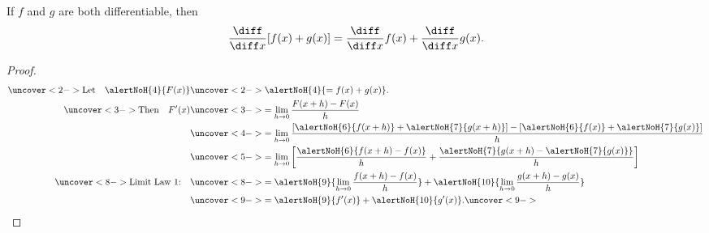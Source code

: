 \begin{frame}
\begin{theorem}
If $f$ and $g$ are both differentiable, then
\abovedisplayskip=0pt
\belowdisplayskip=0pt
\[
\frac{\diff}{\diff x} [f(x) + g(x)] = \frac{\diff}{\diff x} f(x) + \frac{\diff}{\diff x}g(x).
\]
\end{theorem}
\begin{proof}
\abovedisplayskip=0pt
\belowdisplayskip=-15pt
\abovedisplayshortskip=0pt
\belowdisplayshortskip=0pt
\begin{align*}
\uncover<2->{%
\text{Let}\quad \alertNoH{ 4}{F(x)}
}%
 &  \uncover<2->{%
\alertNoH{ 4}{= f(x) + g(x)}.%
}\\%
\uncover<3->{%
\text{Then}\quad F'(x)%
}%
 & \uncover<3->{%
 = \lim_{h\rightarrow 0}\frac{F(x+h)-F(x)}{h}%
}\\%
& \uncover<4->{%
 = \lim_{h\rightarrow 0}\frac{[\alertNoH{ 6}{f(x+h)}+\alertNoH{ 7}{g(x+h)}]-[\alertNoH{ 6}{f(x)}+\alertNoH{ 7}{g(x)}]}{h}%
}\\%
& \uncover<5->{%
 = \lim_{h\rightarrow 0}\left[ \frac{\alertNoH{ 6}{f(x+h) - f(x)}}{h} + \frac{\alertNoH{ 7}{g(x+h)-\alertNoH{ 7}{g(x)}}}{h}\right]%
}\\%
\uncover<8->{%
\text{Limit Law 1:}\quad %
}%
& \uncover<8->{%
 = \alertNoH{9}{ \lim_{h\rightarrow 0} \frac{f(x+h) - f(x)}{h}} + \alertNoH{10}{\lim_{h\rightarrow 0}\frac{g(x+h)-g(x)}{h}}%
}\\%
& \uncover<9->{%
 =\alertNoH{9}{ f'(x)} +\alertNoH{10}{g'(x)}.%
}\uncover<9->{\qedhere}
\end{align*}
\end{proof}
\end{frame}
